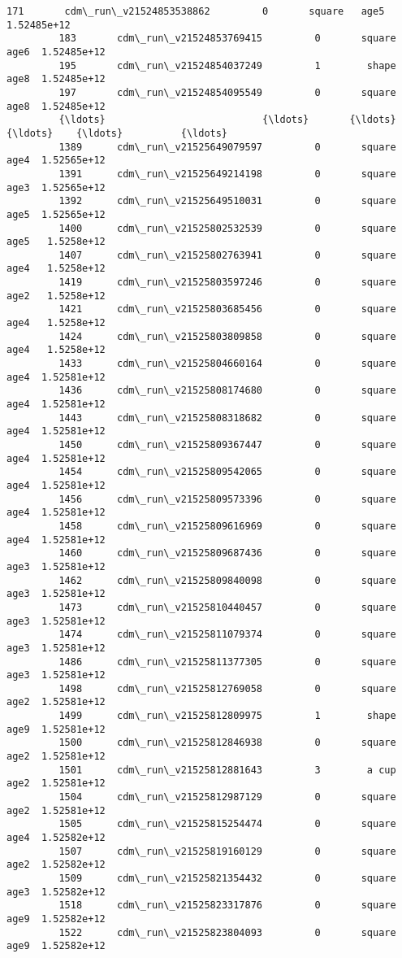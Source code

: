 \documentclass[11pt]{article}
\begin{document}
\begin{Verbatim}[commandchars=\\\{\}]
         171       cdm\_run\_v21524853538862         0       square   age5  1.52485e+12   
         183       cdm\_run\_v21524853769415         0       square   age6  1.52485e+12   
         195       cdm\_run\_v21524854037249         1        shape   age8  1.52485e+12   
         197       cdm\_run\_v21524854095549         0       square   age8  1.52485e+12   
         {\ldots}                           {\ldots}       {\ldots}          {\ldots}    {\ldots}          {\ldots}   
         1389      cdm\_run\_v21525649079597         0       square   age4  1.52565e+12   
         1391      cdm\_run\_v21525649214198         0       square   age3  1.52565e+12   
         1392      cdm\_run\_v21525649510031         0       square   age5  1.52565e+12   
         1400      cdm\_run\_v21525802532539         0       square   age5   1.5258e+12   
         1407      cdm\_run\_v21525802763941         0       square   age4   1.5258e+12   
         1419      cdm\_run\_v21525803597246         0       square   age2   1.5258e+12   
         1421      cdm\_run\_v21525803685456         0       square   age4   1.5258e+12   
         1424      cdm\_run\_v21525803809858         0       square   age4   1.5258e+12   
         1433      cdm\_run\_v21525804660164         0       square   age4  1.52581e+12   
         1436      cdm\_run\_v21525808174680         0       square   age4  1.52581e+12   
         1443      cdm\_run\_v21525808318682         0       square   age4  1.52581e+12   
         1450      cdm\_run\_v21525809367447         0       square   age4  1.52581e+12   
         1454      cdm\_run\_v21525809542065         0       square   age4  1.52581e+12   
         1456      cdm\_run\_v21525809573396         0       square   age4  1.52581e+12   
         1458      cdm\_run\_v21525809616969         0       square   age4  1.52581e+12   
         1460      cdm\_run\_v21525809687436         0       square   age3  1.52581e+12   
         1462      cdm\_run\_v21525809840098         0       square   age3  1.52581e+12   
         1473      cdm\_run\_v21525810440457         0       square   age3  1.52581e+12   
         1474      cdm\_run\_v21525811079374         0       square   age3  1.52581e+12   
         1486      cdm\_run\_v21525811377305         0       square   age3  1.52581e+12   
         1498      cdm\_run\_v21525812769058         0       square   age2  1.52581e+12   
         1499      cdm\_run\_v21525812809975         1        shape   age9  1.52581e+12   
         1500      cdm\_run\_v21525812846938         0       square   age2  1.52581e+12   
         1501      cdm\_run\_v21525812881643         3        a cup   age2  1.52581e+12   
         1504      cdm\_run\_v21525812987129         0       square   age2  1.52581e+12   
         1505      cdm\_run\_v21525815254474         0       square   age4  1.52582e+12   
         1507      cdm\_run\_v21525819160129         0       square   age2  1.52582e+12   
         1509      cdm\_run\_v21525821354432         0       square   age3  1.52582e+12   
         1518      cdm\_run\_v21525823317876         0       square   age9  1.52582e+12   
         1522      cdm\_run\_v21525823804093         0       square   age9  1.52582e+12   
         

\end{Verbatim}
\end{document}

